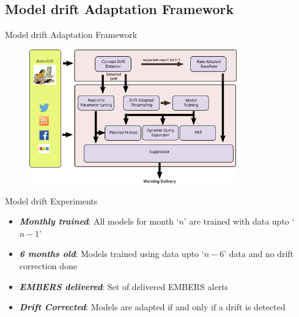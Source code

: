 \subsection{Model drift Adaptation Framework}
\begin{frame}{Model drift Adaptation Framework}
    \begin{figure}
        \centering
        \includegraphics[width=0.8\textwidth]{Problem1/figures/driftAdaptationFramework.png}
    \end{figure}
\end{frame}

\begin{frame}{Model drift Experiments}
\begin{itemize}
    \item \textbf{\textit{Monthly trained}}: All models for month `$n$' are trained with data upto `$n-1$'
    \item \textbf{\textit{6 months old}}: Models trained using data upto `$n-6$' data and no drift correction done
    \item \textit{\textbf{EMBERS delivered}}: Set of delivered EMBERS alerts
    \item \textit{\textbf{Drift Corrected}}: Models are adapted if and only if a drift is detected
\end{itemize}
\end{frame}




